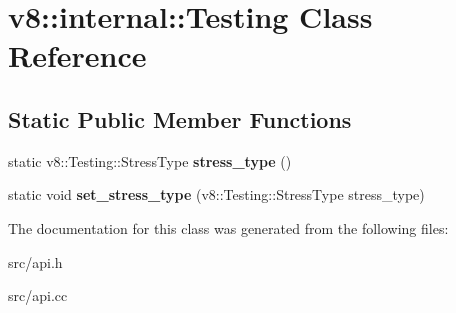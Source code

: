 \hypertarget{classv8_1_1internal_1_1_testing}{}\section{v8\+:\+:internal\+:\+:Testing Class Reference}
\label{classv8_1_1internal_1_1_testing}
\subsection*{Static Public Member Functions}
\begin{DoxyCompactItemize}
\item 
\hypertarget{classv8_1_1internal_1_1_testing_aac7227aab90d2429d7c31028287c54fe}{}static v8\+::\+Testing\+::\+Stress\+Type {\bfseries stress\+\_\+type} ()\label{classv8_1_1internal_1_1_testing_aac7227aab90d2429d7c31028287c54fe}

\item 
\hypertarget{classv8_1_1internal_1_1_testing_a5416ca263ee9b94dc271e6365185fb5c}{}static void {\bfseries set\+\_\+stress\+\_\+type} (v8\+::\+Testing\+::\+Stress\+Type stress\+\_\+type)\label{classv8_1_1internal_1_1_testing_a5416ca263ee9b94dc271e6365185fb5c}

\end{DoxyCompactItemize}


The documentation for this class was generated from the following files\+:\begin{DoxyCompactItemize}
\item 
src/api.\+h\item 
src/api.\+cc\end{DoxyCompactItemize}
